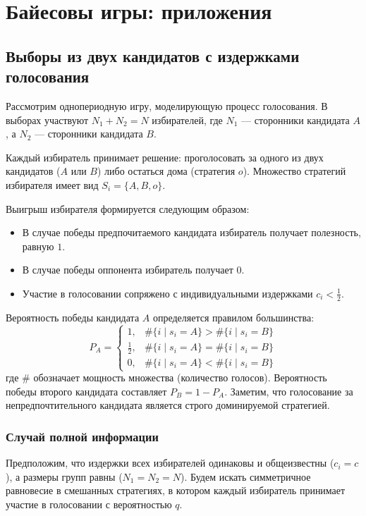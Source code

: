 \section{Байесовы игры: приложения}

\subsection{Выборы из двух кандидатов с издержками голосования}

Рассмотрим однопериодную игру, моделирующую процесс голосования. В выборах участвуют $N_1 + N_2 = N$ избирателей, где $N_1$ — сторонники кандидата $A$, а $N_2$ — сторонники кандидата $B$. 

Каждый избиратель принимает решение: проголосовать за одного из двух кандидатов ($A$ или $B$) либо остаться дома (стратегия $o$). Множество стратегий избирателя имеет вид $S_i = \{A, B, o\}$. 

Выигрыш избирателя формируется следующим образом:
\begin{itemize}
    \item В случае победы предпочитаемого кандидата избиратель получает полезность, равную $1$.
    \item В случае победы оппонента избиратель получает $0$.
    \item Участие в голосовании сопряжено с индивидуальными издержками $c_i < \frac{1}{2}$.
\end{itemize}

Вероятность победы кандидата $A$ определяется правилом большинства:
\begin{equation}
P_A = 
\begin{cases} 
1, & \#\{i \mid s_i = A\} > \#\{i \mid s_i = B\} \\ 
\frac{1}{2}, & \#\{i \mid s_i = A\} = \#\{i \mid s_i = B\} \\ 
0, & \#\{i \mid s_i = A\} < \#\{i \mid s_i = B\} 
\end{cases}
\end{equation}
где $\#$ обозначает мощность множества (количество голосов). Вероятность победы второго кандидата составляет $P_B = 1 - P_A$. Заметим, что голосование за непредпочтительного кандидата является строго доминируемой стратегией.

\subsubsection{Случай полной информации}

Предположим, что издержки всех избирателей одинаковы и общеизвестны ($c_i = c$), а размеры групп равны ($N_1 = N_2 = N$). Будем искать симметричное равновесие в смешанных стратегиях, в котором каждый избиратель принимает участие в голосовании с вероятностью $q$.

